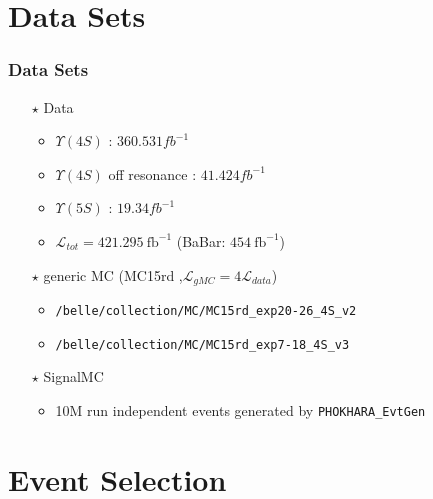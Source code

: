 \documentclass[aspectratio=169]{ctexbeamer}
\begin{document}
\section{Data Sets}

\begin{frame}
  \frametitle{Data Sets}
	\begin{itemize}
    \item[$\star$] Data
    \begin{itemize}
    \item $\Upsilon(4S)$ : $360.531 fb^{-1}$
	  \item $\Upsilon(4S)$ off resonance :  $41.424 fb^{-1}$
	  \item $\Upsilon(5S)$ :  $19.34fb^{-1}$
    \item $\mathcal{L}_{tot} = 421.295\ \mathrm{fb}^{-1}$ (BaBar: $454\ \mathrm{fb}^{-1}$)
    \end{itemize}
    \item[$\star$] generic MC (MC15rd ,$\mathcal{L}_{gMC} = 4\mathcal{L}_{data}$)
    \begin{itemize}
      \item \texttt{/belle/collection/MC/MC15rd\_exp20-26\_4S\_v2}
      \item \texttt{/belle/collection/MC/MC15rd\_exp7-18\_4S\_v3}
    \end{itemize}
    \item[$\star$] SignalMC
    \begin{itemize}
      \item 10M run independent events generated by \texttt{PHOKHARA\_EvtGen}
    \end{itemize}
        \end{itemize}
\end{frame}

\section{Event Selection}
\end{document}
